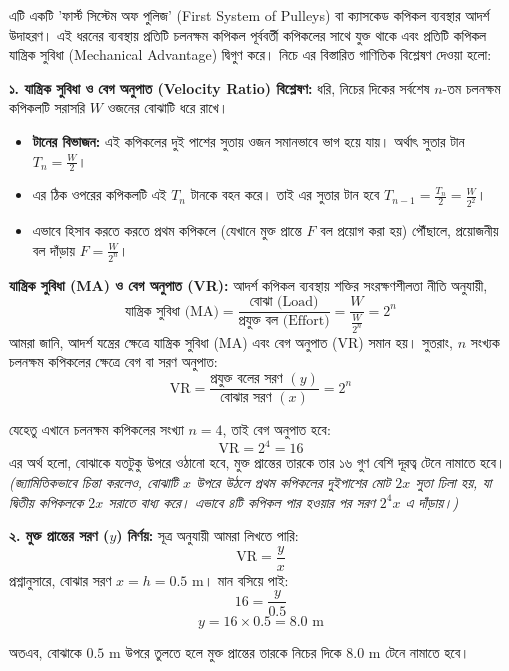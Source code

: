\documentclass[12pt, a4paper]{article}
\begin{document}
\begin{tcolorbox}[solutionbox={সমাধান (Solution)}]
\noindent
এটি একটি 'ফার্স্ট সিস্টেম অফ পুলিজ' (First System of Pulleys) বা ক্যাসকেড কপিকল ব্যবস্থার আদর্শ উদাহরণ। এই ধরনের ব্যবস্থায় প্রতিটি চলনক্ষম কপিকল পূর্ববর্তী কপিকলের সাথে যুক্ত থাকে এবং প্রতিটি কপিকল যান্ত্রিক সুবিধা (Mechanical Advantage) দ্বিগুণ করে। নিচে এর বিস্তারিত গাণিতিক বিশ্লেষণ দেওয়া হলো:

\vspace{0.5em}
\textbf{১. যান্ত্রিক সুবিধা ও বেগ অনুপাত (Velocity Ratio) বিশ্লেষণ:}
ধরি, নিচের দিকের সর্বশেষ $n$-তম চলনক্ষম কপিকলটি সরাসরি $W$ ওজনের বোঝাটি ধরে রাখে। 
\begin{itemize}[leftmargin=1.5em, itemsep=0.2em]
    \item \textbf{টানের বিভাজন:} এই কপিকলের দুই পাশের সুতায় ওজন সমানভাবে ভাগ হয়ে যায়। অর্থাৎ সুতার টান $T_n = \frac{W}{2}$।
    \item এর ঠিক ওপরের কপিকলটি এই $T_n$ টানকে বহন করে। তাই এর সুতার টান হবে $T_{n-1} = \frac{T_n}{2} = \frac{W}{2^2}$।
    \item এভাবে হিসাব করতে করতে প্রথম কপিকলে (যেখানে মুক্ত প্রান্তে $F$ বল প্রয়োগ করা হয়) পৌঁছালে, প্রয়োজনীয় বল দাঁড়ায় $F = \frac{W}{2^n}$।
\end{itemize}

\textbf{যান্ত্রিক সুবিধা (MA) ও বেগ অনুপাত (VR):}
আদর্শ কপিকল ব্যবস্থায় শক্তির সংরক্ষণশীলতা নীতি অনুযায়ী,
$$\text{যান্ত্রিক সুবিধা (MA)} = \frac{\text{বোঝা (Load)}}{\text{প্রযুক্ত বল (Effort)}} = \frac{W}{\frac{W}{2^n}} = 2^n$$
আমরা জানি, আদর্শ যন্ত্রের ক্ষেত্রে যান্ত্রিক সুবিধা (MA) এবং বেগ অনুপাত (VR) সমান হয়। সুতরাং, $n$ সংখ্যক চলনক্ষম কপিকলের ক্ষেত্রে বেগ বা সরণ অনুপাত:
$$\text{VR} = \frac{\text{প্রযুক্ত বলের সরণ }(y)}{\text{বোঝার সরণ }(x)} = 2^n$$

যেহেতু এখানে চলনক্ষম কপিকলের সংখ্যা $n = 4$, তাই বেগ অনুপাত হবে:
$$\text{VR} = 2^4 = 16$$
এর অর্থ হলো, বোঝাকে যতটুকু উপরে ওঠানো হবে, মুক্ত প্রান্তের তারকে তার ১৬ গুণ বেশি দূরত্ব টেনে নামাতে হবে। \textit{(জ্যামিতিকভাবে চিন্তা করলেও, বোঝাটি $x$ উপরে উঠলে প্রথম কপিকলের দুইপাশের মোট $2x$ সুতা ঢিলা হয়, যা দ্বিতীয় কপিকলকে $2x$ সরাতে বাধ্য করে। এভাবে ৪টি কপিকল পার হওয়ার পর সরণ $2^4 x$ এ দাঁড়ায়।)}

\vspace{0.5em}
\textbf{২. মুক্ত প্রান্তের সরণ ($y$) নির্ণয়:}
সূত্র অনুযায়ী আমরা লিখতে পারি:
$$\text{VR} = \frac{y}{x}$$
প্রশ্নানুসারে, বোঝার সরণ $x = h = 0.5\text{ m}$। মান বসিয়ে পাই:
$$16 = \frac{y}{0.5}$$
$$y = 16 \times 0.5 = 8.0\text{ m}$$

অতএব, বোঝাকে $0.5\text{ m}$ উপরে তুলতে হলে মুক্ত প্রান্তের তারকে নিচের দিকে $8.0\text{ m}$ টেনে নামাতে হবে।
\end{tcolorbox}
\vspace{1em}
\end{document}
